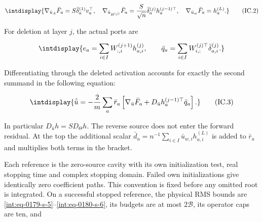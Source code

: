 \begingroup\renewcommand{\theHequation}{intdisplay.294}
\begin{equation}
\intdisplay{
\nabla_{\bar u_A}\bar F_a=S\bar\delta_a^{(1)}v_a^\top,
 \quad\nabla_{\bar u_{H^{(j)}}}\bar F_a
 =\frac{S}{\sqrt n}\bar\delta_a^{(j)}h_a^{(j-1)\top},
 \quad\nabla_{\bar u_w}\bar F_a=h_a^{(L)}.
}
\tag{IC.2}
\label{int:eq-0119-ic-2}
\end{equation}
\endgroup


For deletion at layer \(j\), the actual ports are


\begingroup\renewcommand{\theHequation}{intdisplay.295}
\begin{equation*}
\intdisplay{
e_a=\sum_{i\in I}W^{(j+1)}_{:,i}h_{a,i}^{(j)},\qquad
 \bar q_a=\sum_{i\in I}W^{(j)\top}_{i,:}\bar\delta_{a,i}^{(j)}.
}
\end{equation*}
\endgroup


Differentiating through the deleted activation accounts for exactly the second summand in the following equation:


\begingroup\renewcommand{\theHequation}{intdisplay.296}
\begin{equation}
\intdisplay{
\dot{\bar u}=-\frac{2}{m}\sum_a\bar r_a
 \left[\nabla_{\bar u}\bar F_a+
       D_{\bar u}h_a^{(j-1)\top}\bar q_a\right].
}
\tag{IC.3}
\label{int:eq-0120-ic-3}
\end{equation}
\endgroup


In particular \(D_{\bar u}h=S D_\Theta h\). The reverse source does not enter the forward residual. At the top the additional scalar \(\bar d_a=n^{-1}\sum_{i\in I}\bar u_{w,\allowbreak i}h_{a,\allowbreak i}^{(L)}\) is added to \(\bar r_a\) and multiplies both terms in the bracket.



Each reference is the zero-source cavity with its own initialization test, real stopping time and complex stopping domain. Failed own initializations give identically zero coefficient paths. This convention is fixed before any omitted root is integrated. On a successful stopped reference, the physical RMS bounds are \eqref{int:eq-0179-s-5}--\allowbreak \eqref{int:eq-0180-s-6}, its budgets are at most \(2\mathcal B\), its operator caps are ten, and


